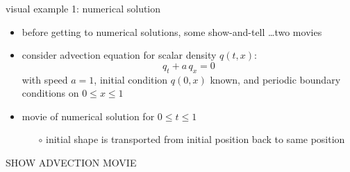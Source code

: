 \documentclass[10pt,hyperref,dvipsnames]{beamer}
\begin{document}
\begin{frame}{visual example 1: numerical solution}

\begin{itemize}
\item before getting to numerical solutions, some show-and-tell \dots two movies
\item consider advection equation for scalar density $q(t,x)$:
    $$q_t + a \, q_x = 0$$
with speed $a=1$, initial condition $q(0,x)$ known, and periodic boundary conditions on $0\le x \le 1$
\item movie of numerical solution for $0\le t \le 1$
    \begin{itemize}
    \item[$\circ$] initial shape is transported from initial position back to same position
    \end{itemize}
\end{itemize}

\vspace{10mm}
\begin{center}
\alert{SHOW ADVECTION MOVIE}
\end{center}
\vspace{10mm}

\end{frame}
\end{document}
